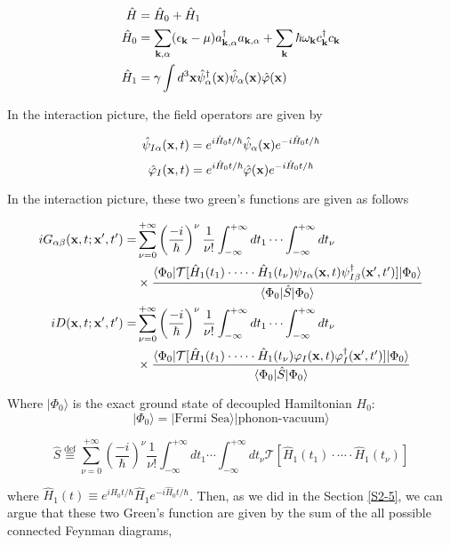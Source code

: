 \[\begin{split}
\hat H &= \hat H_0 + \hat H_1 \\
\hat H_0 &= \sum_{\bf k,\alpha}(\epsilon_{\bf k}-\mu)a_{\bf k,\alpha}^\dagger a_{\bf k,\alpha} + \sum_{\bf k}\hbar\omega_{\bf k}c_{\bf k}^\dagger c_{\bf k}\\
\hat H_1 &= \gamma\int d^3{\bf x}\hat\psi_\alpha^\dagger({\bf x})\hat\psi_\alpha({\bf x})\hat\varphi({\bf x})
\end{split}\]

In the interaction picture, the field operators are given by 

\[\hat\psi_{I\alpha}({\bf x},t) = e^{i\hat H_0t/\hbar}\hat\psi_\alpha({\bf x})e^{-i\hat H_0t/\hbar} \]
\[\hat\varphi_{I}({\bf x},t) = e^{i\hat H_0t/\hbar}\hat\varphi({\bf x})e^{-i\hat H_0t/\hbar} \]

In the interaction picture, these two green's functions are given as follows

\[\begin{split}
iG_{\alpha\beta}({\bf x},t;{\bf x'},t') =& \sum_{\nu = 0}^{+\infty}\left(\frac{-i}{\hbar}\right)^\nu\frac{1}{\nu!}\int_{-\infty}^{+\infty}dt_1\cdots\int_{-\infty}^{+\infty}dt_\nu\\
&\times \frac{\langle\Phi_0|\mathcal{T}[\hat H_1(t_1)\cdot\cdots\cdot\hat H_1(t_\nu)\psi_{I\alpha}({\bf x},t)\psi_{I\beta}^
\dagger({\bf x'},t')]|\Phi_0\rangle}{\langle\Phi_0|\hat S|\Phi_0\rangle}\\
iD({\bf x},t;{\bf x'},t') =& \sum_{\nu = 0}^{+\infty}\left(\frac{-i}{\hbar}\right)^\nu\frac{1}{\nu!}\int_{-\infty}^{+\infty}dt_1\cdots\int_{-\infty}^{+\infty}dt_\nu\\
&\times \frac{\langle\Phi_0|\mathcal{T}[\hat H_1(t_1)\cdot\cdots\cdot\hat H_1(t_\nu)\varphi_{I}({\bf x},t)\varphi_{I}^
\dagger({\bf x'},t')]|\Phi_0\rangle}{\langle\Phi_0|\hat S|\Phi_0\rangle}
\end{split} \]

Where $|\Phi_0\rangle$ is the exact ground state of decoupled Hamiltonian $H_0$:
\[|\Phi_0\rangle = |\text{Fermi Sea}\rangle|\text{phonon-vacuum}\rangle \]

\[\hat S \overset{\text{def}}{\equiv}\sum_{\nu = 0}^{+\infty}\left(\frac{-i}{\hbar}\right)^\nu\frac{1}{\nu!}\int_{-\infty}^{+\infty}dt_1\cdots\int_{-\infty}^{+\infty}dt_\nu\mathcal{T}[\hat H_1(t_1)\cdot\cdots\cdot\hat H_1(t_\nu)]  \]

where $\hat H_1(t) \equiv e^{i\hat H_0t/\hbar}\hat H_1e^{-i\hat H_0t/\hbar}$. Then, as we did in the Section \ref{S2-5}, we can argue that these two Green's function are given by the sum of the all possible connected Feynman diagrams, 

